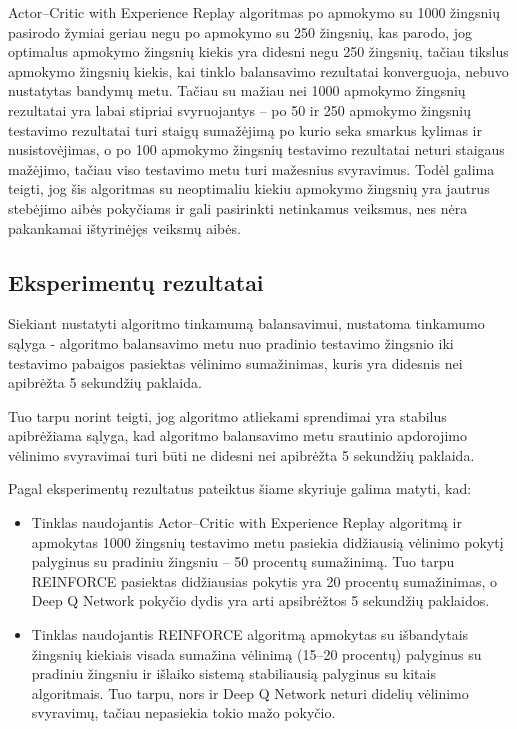 \documentclass{VUMIFPSbakalaurinis}
\begin{document}
Actor–Critic with Experience Replay algoritmas po apmokymo su 1000 žingsnių pasirodo žymiai geriau negu po apmokymo su 250 žingsnių, kas parodo, jog optimalus apmokymo žingsnių kiekis yra didesni negu 250 žingsnių, tačiau tikslus apmokymo žingsnių kiekis, kai tinklo balansavimo rezultatai konverguoja, nebuvo nustatytas bandymų metu. Tačiau su mažiau nei 1000 apmokymo žingsnių rezultatai yra labai stipriai svyruojantys – po 50 ir 250 apmokymo žingsnių testavimo rezultatai turi staigų sumažėjimą po kurio seka smarkus kylimas ir nusistovėjimas, o po 100 apmokymo žingsnių testavimo rezultatai neturi staigaus mažėjimo, tačiau viso testavimo metu turi mažesnius svyravimus. Todėl galima teigti, jog šis algoritmas su neoptimaliu kiekiu apmokymo žingsnių yra jautrus stebėjimo aibės pokyčiams ir gali pasirinkti netinkamus veiksmus, nes nėra pakankamai ištyrinėjęs veiksmų aibės.

\subsection{Eksperimentų rezultatai}

Siekiant nustatyti algoritmo tinkamumą balansavimui, nustatoma tinkamumo sąlyga - algoritmo balansavimo metu nuo pradinio testavimo žingsnio iki testavimo pabaigos pasiektas vėlinimo sumažinimas, kuris yra didesnis nei apibrėžta 5 sekundžių paklaida. 

Tuo tarpu norint teigti, jog algoritmo atliekami sprendimai yra stabilus apibrėžiama sąlyga, kad algoritmo balansavimo metu srautinio apdorojimo vėlinimo svyravimai turi būti ne didesni nei apibrėžta 5 sekundžių paklaida. 

Pagal eksperimentų rezultatus pateiktus šiame skyriuje galima matyti, kad:
\begin{itemize}
    \item Tinklas naudojantis Actor–Critic with Experience Replay algoritmą ir apmokytas 1000 žingsnių testavimo metu pasiekia didžiausią vėlinimo pokytį palyginus su pradiniu žingsniu – 50 procentų sumažinimą. Tuo tarpu REINFORCE pasiektas didžiausias pokytis yra 20 procentų sumažinimas, o Deep Q Network pokyčio dydis yra arti apsibrėžtos 5 sekundžių paklaidos.
    \item Tinklas naudojantis REINFORCE algoritmą apmokytas su išbandytais žingsnių kiekiais visada sumažina vėlinimą (15–20 procentų) palyginus su pradiniu žingsniu ir išlaiko sistemą stabiliausią palyginus su kitais algoritmais. Tuo tarpu, nors ir Deep Q Network neturi didelių vėlinimo svyravimų, tačiau nepasiekia tokio mažo pokyčio.
\end{itemize}
\end{document}
